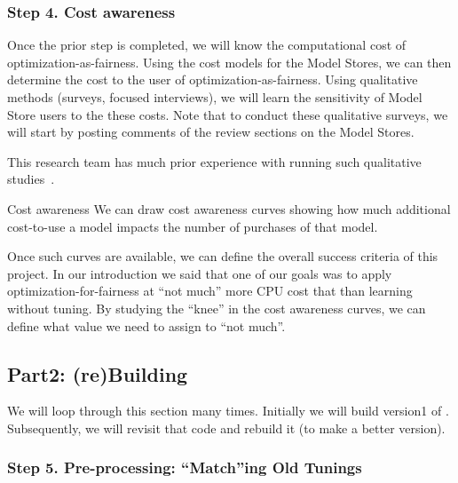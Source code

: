 \subsubsection{Step 4. Cost awareness}\label{tion:costaware} Once the prior step is completed,
we will know the computational cost of optimization-as-fairness.
Using the cost models for the Model Stores, we can then determine the cost to the user of optimization-as-fairness. Using qualitative methods (surveys,
focused interviews), we will learn the   sensitivity of Model
Store users to the these costs. Note that to conduct these qualitative surveys, we will start by  posting  comments   of the review sections on
the   Model Stores. 

This research team has much prior experience with running such qualitative studies~\cite{Menzies:2013:DSS:2486788.2487048,Menzies:2015:ASA:2819009.2819229,Menzies:2016:ADS:2889160.2891047}.


\begin{success}{Cost awareness}
We can draw cost awareness curves showing how much additional
cost-to-use a model impacts the number of purchases of that model.
\end{success}

Once such curves are available, we can define the overall success criteria of this project. In our introduction we said that one of our goals was to apply optimization-for-fairness at    ``not much'' more CPU cost that   than learning without tuning.
By studying the ``knee'' in the cost awareness curves, we can define what
value we need to assign to ``not much''.


 \subsection{Part2: (re)Building {\IT}}
 We will loop through this section many times. Initially
 we will build version1 of {\IT}. Subsequently,
 we will revisit that code and rebuild it (to make a better
 version).

\subsubsection{Step 5. Pre-processing: ``Match''ing Old Tunings} %

